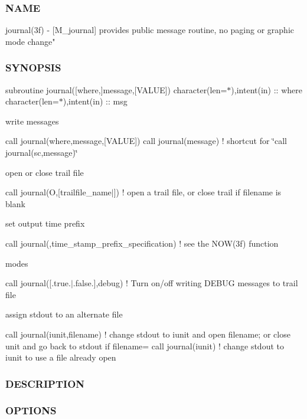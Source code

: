 \subsubsection*{N\+A\+ME}

journal(3f) -\/ \mbox{[}M\+\_\+journal\mbox{]} provides public message routine, no paging or graphic mode change" \subsubsection*{S\+Y\+N\+O\+P\+S\+IS}

subroutine journal(\mbox{[}where,\mbox{]}message,\mbox{[}\+V\+A\+L\+U\+E\mbox{]}) character(len=$\ast$),intent(in) \+:\+: where character(len=$\ast$),intent(in) \+:\+: msg

write messages

call journal(where,message,\mbox{[}\+V\+A\+L\+U\+E\mbox{]}) call journal(message) ! shortcut for \char`\"{}call journal(\textquotesingle{}sc\textquotesingle{},message)\char`\"{}

open or close trail file

call journal(\textquotesingle{}O\textquotesingle{},\mbox{[}trailfile\+\_\+name$\vert$\textquotesingle{}\textquotesingle{}\mbox{]}) ! open a trail file, or close trail if filename is blank

set output time prefix

call journal(\textquotesingle{}\textquotesingle{},time\+\_\+stamp\+\_\+prefix\+\_\+specification) ! see the N\+O\+W(3f) function

modes

call journal(\mbox{[}.true.$\vert$.false.\mbox{]},\textquotesingle{}debug\textquotesingle{}) ! Turn on/off writing D\+E\+B\+UG messages to trail file

assign stdout to an alternate file

call journal(iunit,filename) ! change stdout to iunit and open filename; or close unit and go back to stdout if filename=\textquotesingle{}\textquotesingle{} call journal(iunit) ! change stdout to iunit to use a file already open

\subsubsection*{D\+E\+S\+C\+R\+I\+P\+T\+I\+ON}

\subsubsection*{O\+P\+T\+I\+O\+NS}

